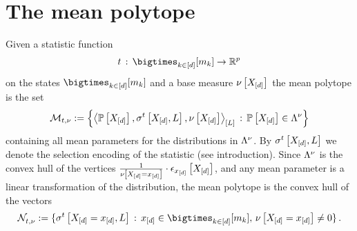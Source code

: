 \section{The mean polytope}\label{sec:meanPolytope}

Given a statistic function
\begin{align*}
    \sstat \wcols \facstates \rightarrow \rr^{\seldim}
\end{align*}
on the states $\facstates$ and a base measure $\nu\left[X_{[d]}\right]$ the mean polytope is the set
\begin{align*}
    \mathcal{M}_{t,\nu}
    := \left\{\left\langle \mathbb{P}\left[X_{[d]}\right],\sigma^{t}\left[X_{[d]},L\right],\nu\left[X_{[d]}\right]\right\rangle_{\left[ L \right]}\,:\,\mathbb{P}\left[X_{[d]}\right]\in\Lambda^{\nu} \right\}
\end{align*}
containing all mean parameters for the distributions in $\Lambda^{\nu}$.
By $\sigma^{t}\left[X_{[d]},L\right]$ we denote the selection encoding of the statistic (see introduction).
Since $\Lambda^{\nu}$ is the convex hull of the vertices $\frac{1}{\nu\left[X_{[d]}=x_{[d]}\right]} \cdot \epsilon_{x_{[d]}}\left[X_{[d]}\right]$, and any mean parameter is a linear transformation of the distribution, the mean polytope is the convex hull of the vectors
\begin{align*}
    \genimset
    \coloneqq \{\sencsstatat{\indexedshortcatvariables,\selvariable}
    \wcols\shortcatindices\in\facstates\ncond\basemeasureat{\indexedshortcatvariables}\neq0 \} \, .
\end{align*}


